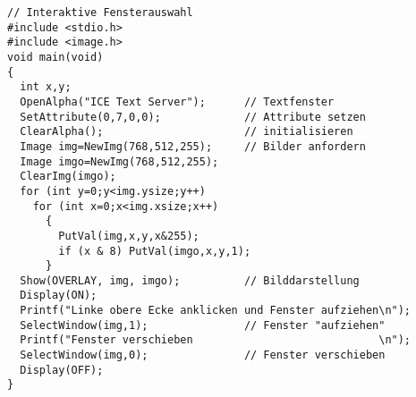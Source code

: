 \begprogr\begin{verbatim}
// Interaktive Fensterauswahl 
#include <stdio.h>
#include <image.h>
void main(void)
{
  int x,y;
  OpenAlpha("ICE Text Server");      // Textfenster
  SetAttribute(0,7,0,0);             // Attribute setzen
  ClearAlpha();                      // initialisieren 
  Image img=NewImg(768,512,255);     // Bilder anfordern
  Image imgo=NewImg(768,512,255);
  ClearImg(imgo);
  for (int y=0;y<img.ysize;y++)
    for (int x=0;x<img.xsize;x++)
      {
        PutVal(img,x,y,x&255);
        if (x & 8) PutVal(imgo,x,y,1);
      }  
  Show(OVERLAY, img, imgo);          // Bilddarstellung
  Display(ON);
  Printf("Linke obere Ecke anklicken und Fenster aufziehen\n");
  SelectWindow(img,1);               // Fenster "aufziehen" 
  Printf("Fenster verschieben                             \n");
  SelectWindow(img,0);               // Fenster verschieben
  Display(OFF);
}
\end{verbatim}\endprogr

